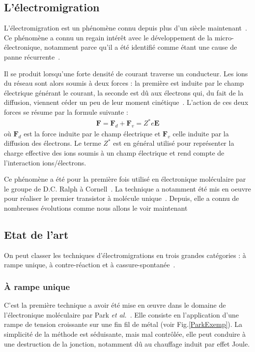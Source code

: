 \subsection{L'électromigration}
L'électromigration est un phénomène connu depuis plus d'un siècle maintenant~\cite{Gerardin1861}. Ce phénomène a connu un regain intérêt avec le développement de la micro-électronique, notamment parce qu'il a été identifié comme étant une cause de panne récurrente~\cite{Blech1967,Black1969}.

Il se produit lorsqu'une forte densité de courant traverse un conducteur. Les ions du réseau sont alors soumis à deux forces : la première est induite par le champ électrique générant le courant, la seconde est d\^u aux électrons qui, du fait de la diffusion, viennent céder un peu de leur moment cinétique~\cite{Ho1989}. L'action de ces deux forces se résume par la formule suivante :
\begin{eqnarray}
\textbf{F} = \textbf{F}_d + \textbf{F}_v = Z^*e\textbf{E} \nonumber
\end{eqnarray}
où $\textbf{F}_d$ est la force induite par le champ électrique et $\textbf{F}_v$ celle induite par la diffusion des électrons. Le terme $Z^*$ est en général utilisé pour représenter la charge effective des ions soumis à un champ électrique et rend compte de l'interaction ions/électrons.

Ce phénomène a été pour la première fois utilisé en électronique moléculaire par le groupe de D.C. Ralph à Cornell~\cite{Park1999}. La technique a notamment été mis en oeuvre pour réaliser le premier transistor à molécule unique~\cite{Park2000}. Depuis, elle a connu de nombreuses évolutions comme nous allons le voir maintenant

\subsection{Etat de l'art}
On peut classer les techniques d'électromigrations en trois grandes catégories : à rampe unique, à contre-réaction et à cassure-spontanée~\cite{Girod2012}.

\subsubsection{À rampe unique}
C'est la première technique a avoir été mise en œuvre dans le domaine de l'électronique moléculaire par Park \textit{et al.}~\cite{Park1999}. Elle consiste en l'application d'une rampe de tension croissante sur une fin fil de métal (voir Fig.\ref{ParkExemp}). La simplicité de la méthode est séduisante, mais mal contrôlée, elle peut conduire à une destruction de la jonction, notamment dû au chauffage induit par effet Joule.

